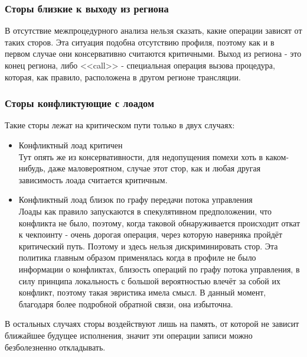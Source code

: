 \documentclass[a4paper,12pt,titlepage]{article}
\begin{document}
\subsubsection{Сторы близкие к выходу из региона}
В отсутствие межпроцедурного анализа нельзя сказать, какие операции зависят от таких сторов. Эта ситуация подобна отсутствию профиля, поэтому как и в первом случае они консервативно считаются критичными. Выход из региона - это конец региона, либо <<call>> - специальная операция вызова процедура, которая, как правило, расположена в другом регионе трансляции.
\subsubsection{Сторы конфликтующие с лоадом}
Такие сторы лежат на критическом пути только в двух случаях:
\begin{itemize}
	\item Конфликтный лоад критичен\\
		Тут опять же из консервативности, для недопущения помехи хоть в каком-нибудь, даже маловероятном, случае этот стор, как и любая другая зависимость лоада считается критичным.
	\item Конфликтный лоад близок по графу передачи потока управления\\
		Лоады как правило запускаются в спекулятивном предположении, что конфликта не было, поэтому, когда таковой обнаруживается происходит откат к чекпоинту - очень дорогая операция, через которую наверняка пройдёт критический путь. Поэтому и здесь нельзя дискриминировать стор. Эта политика главным образом применялась когда в профиле не было информации о конфликтах, близость операций по графу потока управления, в силу принципа локальность с большой вероятностью влечёт за собой их конфликт, поэтому такая эвристика имела смысл. В данный момент, благодаря более подробной обратной связи, она избыточна.
\end{itemize}
В остальных случаях сторы воздействуют лишь на память, от которой не зависит ближайшее будущее исполнения, значит эти операции записи можно безболезненно откладывать.
\end{document}

